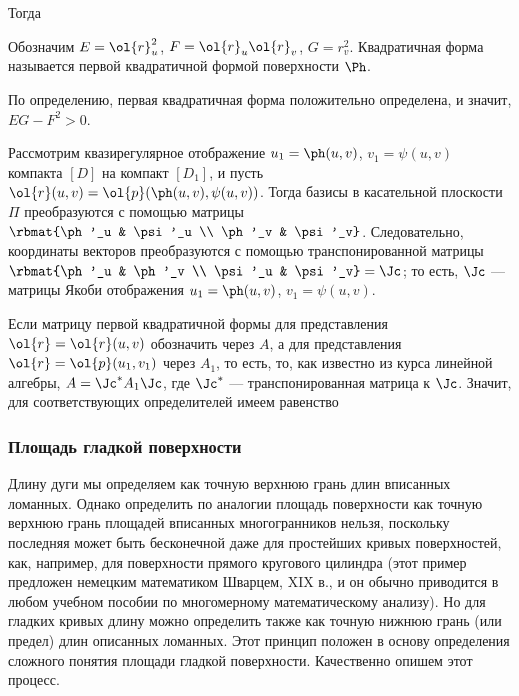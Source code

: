 \documentclass[a4paper]{article}
\begin{document}
Тогда 

Обозначим $E=\ol{r}^2_u$, $F=\ol{r}_u\ol{r}_v$, $G=r^2_v$.
Квадратичная форма  называется первой квадратичной формой поверхности $\Ph$.

По определению, первая квадратичная форма положительно определена, и
значит, $EG-F^2>0$.

Рассмотрим квазирегулярное отображение $u_1=\ph(u,v)$,
$v_1=\psi(u,v)$ компакта $[D]$ на компакт $[D_1]$, и пусть
$\ol{r}(u,v) = \ol{p}(\ph(u,v),\psi(u,v))$. Тогда базисы в
касательной плоскости $\Pi$ преобразуются с помощью матрицы
$\rbmat{\ph'_u & \psi'_u \\ \ph'_v & \psi'_v}$. Следовательно,
координаты векторов преобразуются с помощью транспонированной
матрицы $\rbmat{\ph'_u & \ph'_v \\ \psi'_u & \psi'_v}=\Jc$; то есть,
$\Jc$ --- матрицы Якоби отображения $u_1=\ph(u,v)$, $v_1=\psi(u,v)$.

Если матрицу первой квадратичной формы для представления
$\ol{r}=\ol{r}(u,v)$ обозначить через $A$, а для представления
$\ol{r}=\ol{p}(u_1,v_1)$ через $A_1$, то есть,  то, как известно из курса линейной алгебры,
$A=\Jc^* A_1 \Jc$, где $\Jc^*$ --- транспонированная матрица к
$\Jc$. Значит, для соответствующих определителей имеем равенство


\subsubsection{Площадь гладкой поверхности}

Длину дуги мы определяем как точную верхнюю грань длин вписанных
ломанных. Однако определить по аналогии площадь поверхности как
точную верхнюю грань площадей вписанных многогранников нельзя,
поскольку последняя может быть бесконечной даже для простейших
кривых поверхностей, как, например, для поверхности прямого
кругового цилиндра (этот пример предложен немецким математиком
Шварцем, XIX в., и он обычно приводится в любом учебном пособии по
многомерному математическому анализу). Но для гладких кривых длину
можно определить также как точную нижнюю грань (или предел) длин
описанных ломанных. Этот принцип положен в основу определения
сложного понятия площади гладкой поверхности. Качественно опишем
этот процесс.
\end{document}

